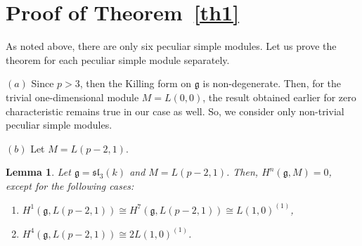 \documentclass[10pt,a4paper]{amsart}
\numberwithin{equation}{section}
\newtheorem{Lemma}[Theorem]{Lemma}
\begin{document}
\section{Proof of Theorem~\ref{th1}}%

As noted above, there are only six peculiar simple modules. Let us prove the theorem for each peculiar simple module separately.

 $(a)$ Since $p>3$, then the Killing form on $\mathfrak{g}$ is non-degenerate. Then, for the trivial one-dimensional module $M=L(0,0)$, the result obtained earlier for zero characteristic remains true in our case as well. So, we consider only non-trivial peculiar simple modules.

$(b)$ Let $M=L(p-2,1)$.

\begin{Lemma}\label{l1}
Let $\mathfrak{g}=\mathfrak{sl}_3(k)$ and $M=L(p-2,1)$. Then, $H^n(\mathfrak{g},M)=0$, except for the following cases:
\begin{enumerate}\itemsep=0pt
\item[$(i)$] $H^1(\mathfrak{g},L(p-2,1))\cong H^7(\mathfrak{g},L(p-2,1))\cong L(1,0)^{(1)}$,
\item[$(ii)$] $H^4(\mathfrak{g},L(p-2,1))\cong 2L(1,0)^{(1)}$.
\end{enumerate}
\end{Lemma}
\end{document}
